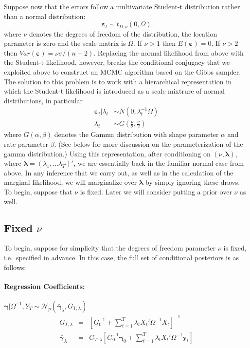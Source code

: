 \documentclass[12pt]{article}
\begin{document}
Suppose now that the errors follow a multivariate Student-t distribution rather than a normal distribution: 
\begin{equation*}
  \boldsymbol{\varepsilon}_{t}\sim t_{D,\nu }\left( 0,\Omega \right)
\end{equation*}
where $\nu$ denotes the degrees of freedom of the distribution, the location parameter is zero and the scale matrix is $\Omega$.
If $\nu >1$ then $E(\boldsymbol{\varepsilon}) = 0$. 
If $\nu>2$ then $Var\left( \boldsymbol{\varepsilon} \right) = \nu \sigma/(n-2)$.
Replacing the normal likelihood from above with the Student-t likelihood, however, breaks the conditional conjugacy that we exploited above to construct an MCMC algorithm based on the Gibbs sampler.
The solution to this problem is to work with a hierarchical representation in which the Student-t likelihood is introduced as a scale mixtrure of normal distributions, in particular
\begin{align*}
  \boldsymbol{\varepsilon}_{t}|\lambda _{t} &\sim N\left( 0,\lambda _{t}^{-1}\Omega \right)
\\
\lambda _{t} &\sim G\left( \frac{\nu }{2},\frac{\nu }{2}\right)
\end{align*}
where $G(\alpha,\beta)$ denotes the Gamma distribution with shape parameter $\alpha$ and rate parameter $\beta$.
(See below for more discussion on the parameterization of the gamma distribution.)
Using this representation, after conditioning on $\left( \nu, \boldsymbol{\lambda} \right)$, where $\boldsymbol{\lambda} = (\lambda_1, \dots \lambda_T)'$, we are essentially back in the familiar normal case from above.
In any inference that we carry out, as well as in the calculation of the marginal likelihood, we will marginalize over $\boldsymbol{\lambda}$ by simply ignoring these draws.
To begin, suppose that $\nu$ is fixed.
Later we will consider putting a prior over $\nu$ as well.

\subsection{Fixed $\nu$}
To begin, suppose for simplicity that the degrees of freedom parameter $\nu$ is fixed, i.e.\ specified in advance.
In this case, the full set of conditional posteriors is as follows:
\paragraph{Regression Coefficients:} 
$\boldsymbol{\gamma}|\Omega^{-1},Y_T \sim \mathcal{N}_p\left( \bar{\boldsymbol{\gamma}}_{\lambda},G_{T,\lambda} \right)$
\begin{eqnarray*}
  G_{T,\lambda} &=& \left[ G_0^{-1} + \sum_{t=1}^T \lambda_t X_t' \Omega^{-1} X_t \right]^{-1}\\
  \bar{\boldsymbol{\gamma}}_{\lambda} &=& G_{T,\lambda} \left[ G_0^{-1}\boldsymbol{\gamma}_0 + \sum_{t=1}^{T}\lambda_t X_t'\Omega^{-1}\mathbf{y}_t \right]
\end{eqnarray*}
\end{document}
